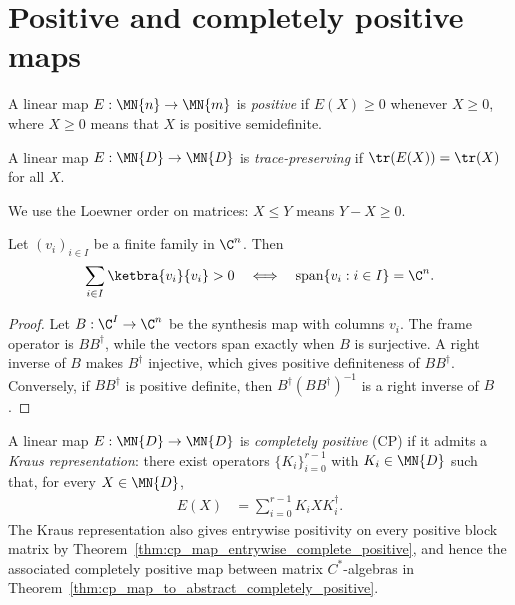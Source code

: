 \section{Positive and completely positive maps}

\begin{definition}\label{def:positive_map}
    \leanok
    A linear map $E : \MN{n} \to \MN{m}$ is \emph{positive}
    if $E(X) \ge 0$ whenever $X \ge 0$, where $X \ge 0$
    means that $X$ is positive semidefinite.
\end{definition}

\begin{definition}\label{def:trace_preserving}
    \leanok
    A linear map $E : \MN{D} \to \MN{D}$ is \emph{trace-preserving}
    if $\tr(E(X)) = \tr(X)$ for all $X$.
\end{definition}

\begin{remark}\leanok
    We use the Loewner order on matrices: $X \le Y$ means
    $Y - X \ge 0$.
\end{remark}

\begin{theorem}
    \label{thm:finite_frame_posdef}
    \leanok
    Let $(v_i)_{i\in I}$ be a finite family in $\C^n$. Then
    \begin{align}
        \sum_{i\in I}\ketbra{v_i}{v_i}>0
        \quad\Longleftrightarrow\quad
        \operatorname{span}\{v_i:i\in I\}=\C^n.
        \notag
    \end{align}
\end{theorem}

\begin{proof}\leanok
    Let $B:\C^I\to\C^n$ be the synthesis map with columns $v_i$.
    The frame operator is $BB^\dagger$, while the vectors span exactly when
    $B$ is surjective. A right inverse of $B$ makes $B^\dagger$ injective,
    which gives positive definiteness of $BB^\dagger$. Conversely, if
    $BB^\dagger$ is positive definite, then
    $B^\dagger(BB^\dagger)^{-1}$ is a right inverse of $B$.
\end{proof}

\begin{definition}\label{def:cp_map}
    \leanok
    A linear map $E : \MN{D} \to \MN{D}$ is \emph{completely positive} (CP)
    if it admits a \emph{Kraus representation}: there exist operators
    $\{K_i\}_{i=0}^{r-1}$ with $K_i \in \MN{D}$ such that, for every
    $X \in \MN{D}$,
    \begin{align}
        E(X)
         & = \sum_{i=0}^{r-1} K_i X K_i^\dagger.
        \label{eq:channel_kraus_representation}
    \end{align}
    The Kraus representation also gives entrywise positivity on every positive
    block matrix by Theorem~\ref{thm:cp_map_entrywise_complete_positive}, and hence
    the associated completely positive map between matrix $C^*$-algebras in
    Theorem~\ref{thm:cp_map_to_abstract_completely_positive}.
\end{definition}

